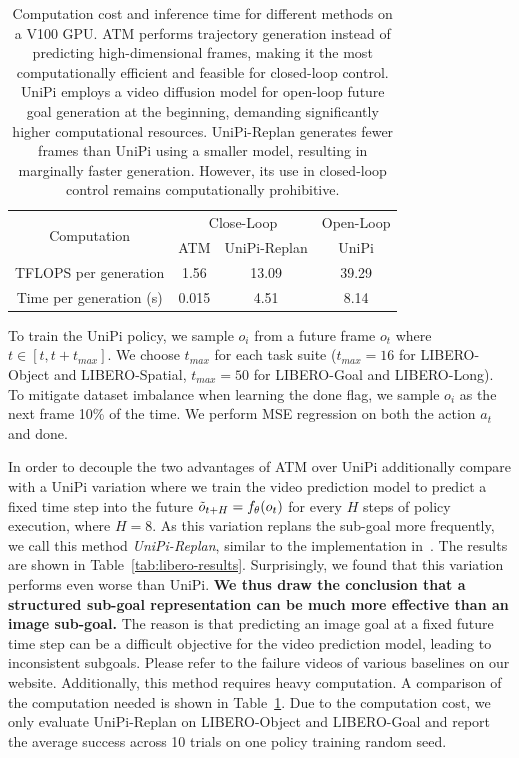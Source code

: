 \begin{table}[ht]
    \centering
    \caption{Computation cost and inference time for different methods on a V100 GPU. ATM performs trajectory generation instead of predicting high-dimensional frames, making it the most computationally efficient and feasible for closed-loop control. UniPi employs a video diffusion model for open-loop future goal generation at the beginning, demanding significantly higher computational resources. UniPi-Replan generates fewer frames than UniPi using a smaller model, resulting in marginally faster generation. However, its use in closed-loop control remains computationally prohibitive.}
    \begin{tabular}{c c c c}
    \toprule
    \multirow{2}{*}{Computation} & \multicolumn{2}{c}{Close-Loop} & Open-Loop \\
     &  ATM & UniPi-Replan & UniPi\\
    \midrule
    TFLOPS per generation        & 1.56 & 13.09 & 39.29 \\
    Time per generation (s)  & 0.015 & 4.51   & 8.14  \\
    \bottomrule
    \end{tabular}
    \label{tab:runtime}
\end{table}

To train the UniPi policy, we sample $o_{i}$ from a future frame $o_{t}$ where $t \in [t, t+t_{max}]$. We choose $t_{max}$ for each task suite ($t_{max} = 16$ for LIBERO-Object and LIBERO-Spatial, $t_{max} = 50$ for LIBERO-Goal and LIBERO-Long). To mitigate dataset imbalance when learning the done flag, we sample $o_{i}$ as the next frame 10\% of the time. We perform MSE regression on both the action $a_t$ and done.

In order to decouple the two advantages of ATM over UniPi additionally compare with a UniPi variation where we train the video prediction model to predict a fixed time step into the future $\Tilde{o}_{t+H}= f_\theta(o_t)$ for every $H$ steps of policy execution, where $H=8$. As this variation replans the sub-goal more frequently, we call this method \textit{UniPi-Replan}, similar to the implementation in~\cite{black2023zero}. The results are shown in Table~\ref{tab:libero-results}. Surprisingly, we found that this variation performs even worse than UniPi. \textbf{We thus draw the conclusion that a structured sub-goal representation can be much more effective than an image sub-goal.}  The reason is that predicting an image goal at a fixed future time step can be a difficult objective for the video prediction model, leading to inconsistent subgoals. Please refer to the failure videos of various baselines on our website. Additionally, this method requires heavy computation. A comparison of the computation needed is shown in Table~\ref{tab:runtime}. Due to the computation cost, we only evaluate UniPi-Replan on LIBERO-Object and LIBERO-Goal and report the average success across 10 trials on one policy training random seed.




